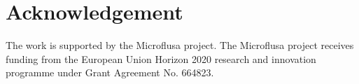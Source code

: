 \section*{Acknowledgement}
The work is supported by the Microflusa project. The Microflusa project receives funding from the European Union Horizon 2020 research and innovation programme
under Grant Agreement No. 664823.

